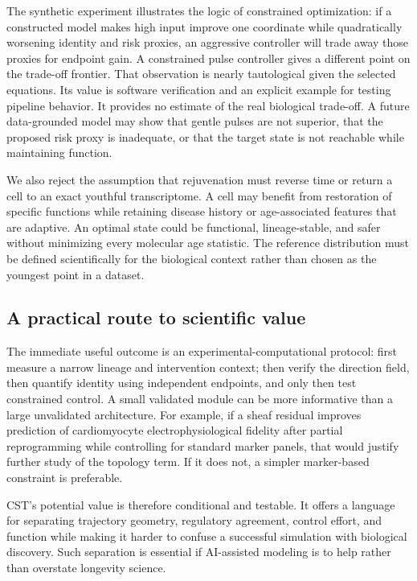 \documentclass[11pt,a4paper]{article}
\theoremstyle{definition}
\theoremstyle{remark}
\begin{document}
The synthetic experiment illustrates the logic of constrained optimization: if a constructed model makes high input improve one coordinate while quadratically worsening identity and risk proxies, an aggressive controller will trade away those proxies for endpoint gain. A constrained pulse controller gives a different point on the trade-off frontier. That observation is nearly tautological given the selected equations. Its value is software verification and an explicit example for testing pipeline behavior. It provides no estimate of the real biological trade-off. A future data-grounded model may show that gentle pulses are not superior, that the proposed risk proxy is inadequate, or that the target state is not reachable while maintaining function.

We also reject the assumption that rejuvenation must reverse time or return a cell to an exact youthful transcriptome. A cell may benefit from restoration of specific functions while retaining disease history or age-associated features that are adaptive. An optimal state could be functional, lineage-stable, and safer without minimizing every molecular age statistic. The reference distribution must be defined scientifically for the biological context rather than chosen as the youngest point in a dataset.

\subsection{A practical route to scientific value}
The immediate useful outcome is an experimental-computational protocol: first measure a narrow lineage and intervention context; then verify the direction field, then quantify identity using independent endpoints, and only then test constrained control. A small validated module can be more informative than a large unvalidated architecture. For example, if a sheaf residual improves prediction of cardiomyocyte electrophysiological fidelity after partial reprogramming while controlling for standard marker panels, that would justify further study of the topology term. If it does not, a simpler marker-based constraint is preferable.

CST's potential value is therefore conditional and testable. It offers a language for separating trajectory geometry, regulatory agreement, control effort, and function while making it harder to confuse a successful simulation with biological discovery. Such separation is essential if AI-assisted modeling is to help rather than overstate longevity science.
\end{document}
